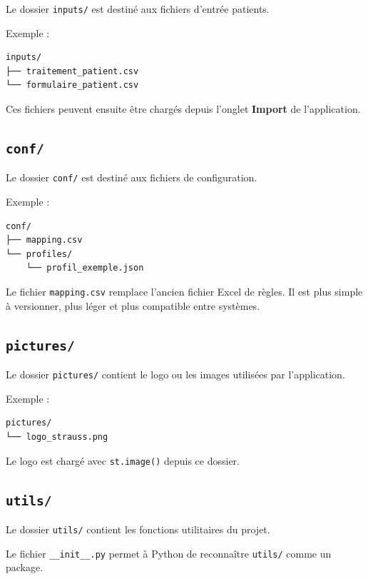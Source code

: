 \documentclass[11pt,a4paper]{article}
\begin{document}
Le dossier \texttt{inputs/} est destiné aux fichiers d'entrée patients.

Exemple :

\begin{lstlisting}
inputs/
├── traitement_patient.csv
└── formulaire_patient.csv
\end{lstlisting}

Ces fichiers peuvent ensuite être chargés depuis l'onglet \textbf{Import} de
l'application.

\subsection{\texttt{conf/}}

Le dossier \texttt{conf/} est destiné aux fichiers de configuration.

Exemple :

\begin{lstlisting}
conf/
├── mapping.csv
└── profiles/
    └── profil_exemple.json
\end{lstlisting}

Le fichier \texttt{mapping.csv} remplace l'ancien fichier Excel de règles. Il
est plus simple à versionner, plus léger et plus compatible entre systèmes.

\subsection{\texttt{pictures/}}

Le dossier \texttt{pictures/} contient le logo ou les images utilisées par
l'application.

Exemple :

\begin{lstlisting}
pictures/
└── logo_strauss.png
\end{lstlisting}

Le logo est chargé avec \texttt{st.image()} depuis ce dossier.

\subsection{\texttt{utils/}}

Le dossier \texttt{utils/} contient les fonctions utilitaires du projet.

Le fichier \texttt{\_\_init\_\_.py} permet à Python de reconnaître
\texttt{utils/} comme un package.
\end{document}

